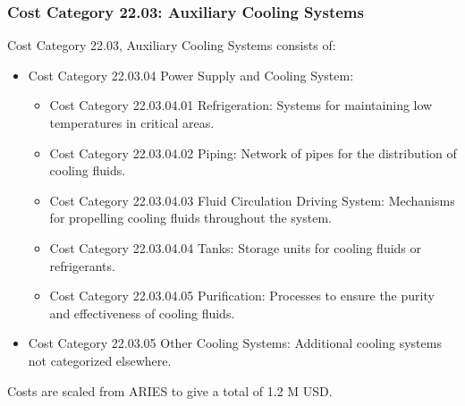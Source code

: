 \subsubsection{Cost Category 22.03: Auxiliary Cooling Systems}

Cost Category 22.03, Auxiliary Cooling Systems consists of:

\begin{itemize}
    \item Cost Category 22.03.04 Power Supply and Cooling System: 
    \begin{itemize}
        \item Cost Category 22.03.04.01 Refrigeration: Systems for maintaining low temperatures in critical areas.
        \item Cost Category 22.03.04.02 Piping: Network of pipes for the distribution of cooling fluids.
        \item Cost Category 22.03.04.03 Fluid Circulation Driving System: Mechanisms for propelling cooling fluids throughout the system.
        \item Cost Category 22.03.04.04 Tanks: Storage units for cooling fluids or refrigerants.
        \item Cost Category 22.03.04.05 Purification: Processes to ensure the purity and effectiveness of cooling fluids.
    \end{itemize}
    \item Cost Category 22.03.05 Other Cooling Systems: Additional cooling systems not categorized elsewhere.
\end{itemize}




Costs are scaled from ARIES to give a total of 1.2 M USD.